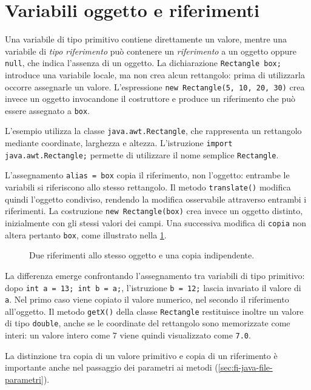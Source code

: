 \section{Variabili oggetto e riferimenti}
\label{sec:fi-java-riferimenti}

Una variabile di tipo primitivo contiene direttamente un valore,
mentre una variabile di \emph{tipo riferimento} può contenere un
\emph{riferimento} a un oggetto oppure \texttt{null}, che indica
l'assenza di un oggetto. La dichiarazione
\texttt{Rectangle box;} introduce una variabile locale, ma non
crea alcun rettangolo: prima di utilizzarla occorre assegnarle
un valore. L'espressione \texttt{new Rectangle(5, 10, 20, 30)}
crea invece un oggetto invocandone il costruttore e produce
un riferimento che può essere assegnato a \texttt{box}.

L'esempio utilizza la classe \texttt{java.awt.Rectangle}, che
rappresenta un rettangolo mediante coordinate, larghezza e
altezza. L'istruzione \texttt{import java.awt.Rectangle;}
permette di utilizzare il nome semplice \texttt{Rectangle}.

\clearpage



L'assegnamento \texttt{alias = box} copia il riferimento, non
l'oggetto: entrambe le variabili si riferiscono allo stesso
rettangolo. Il metodo \texttt{translate()} modifica quindi
l'oggetto condiviso, rendendo la modifica osservabile attraverso
entrambi i riferimenti. La costruzione
\texttt{new Rectangle(box)} crea invece un oggetto distinto,
inizialmente con gli stessi valori dei campi. Una successiva
modifica di \texttt{copia} non altera pertanto \texttt{box},
come illustrato nella \cref{fig:fi-java-alias-copia}.

\begin{figure}[htbp]
  \centering
  
  \caption{Due riferimenti allo stesso oggetto e una copia indipendente.}
  \label{fig:fi-java-alias-copia}
\end{figure}

La differenza emerge confrontando l'assegnamento tra variabili
di tipo primitivo: dopo \texttt{int a = 13; int b = a;},
l'istruzione \texttt{b = 12;} lascia invariato il valore
di \texttt{a}. Nel primo caso viene copiato il valore
numerico, nel secondo il riferimento all'oggetto.
Il metodo \texttt{getX()} della classe \texttt{Rectangle}
restituisce inoltre un valore di tipo \texttt{double},
anche se le coordinate del rettangolo sono memorizzate come
interi: un valore intero come \(7\) viene quindi visualizzato
come \texttt{7.0}.

La distinzione tra copia di un valore primitivo e copia di un
riferimento è importante anche nel passaggio dei parametri ai
metodi (\cref{sec:fi-java-file-parametri}).
